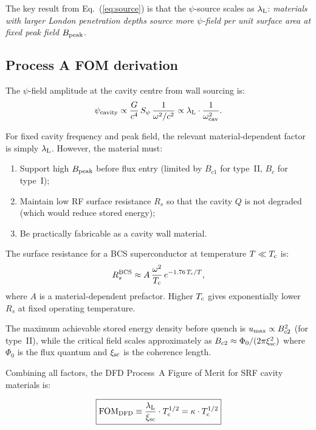 \documentclass[11pt]{article}
\newcommand{\lambdaL}{\lambda_{\rm L}}
\newcommand{\xsc}{\xi_{\rm sc}}
\newcommand{\Tc}{T_{\rm c}}
\newcommand{\FOM}{\mathrm{FOM}}
\begin{document}
The key result from Eq.~(\ref{eq:source}) is that the $\psi$-source scales
as $\lambdaL$: \emph{materials with larger London penetration depths source
more $\psi$-field per unit surface area at fixed peak field $B_{\rm peak}$.}

\subsection{Process A FOM derivation}

The $\psi$-field amplitude at the cavity centre from wall sourcing is:
\begin{equation}
\psi_{\rm cavity} \propto \frac{G}{c^4}\,S_\psi\,\frac{1}{\omega^2 / c^2}
\propto \lambdaL \cdot \frac{1}{\omega_{\rm cav}^2}.
\end{equation}

For fixed cavity frequency and peak field, the relevant material-dependent
factor is simply $\lambdaL$. However, the material must:
\begin{enumerate}
\item Support high $B_{\rm peak}$ before flux entry (limited by $B_{c1}$ for
  type~II, $B_c$ for type~I);
\item Maintain low RF surface resistance $R_s$ so that the cavity $Q$ is not
  degraded (which would reduce stored energy);
\item Be practically fabricable as a cavity wall material.
\end{enumerate}

The surface resistance for a BCS superconductor at temperature $T \ll \Tc$ is:
\begin{equation}
R_s^{\rm BCS} \approx A\,\frac{\omega^2}{\Tc}\,e^{-1.76\,\Tc/T},
\label{eq:Rs}
\end{equation}
where $A$ is a material-dependent prefactor. Higher $\Tc$ gives exponentially
lower $R_s$ at fixed operating temperature.

The maximum achievable stored energy density before quench is
$u_{\rm max} \propto B_{c2}^2$ (for type~II), while the critical field
scales approximately as $B_{c2} \approx \Phi_0 / (2\pi \xsc^2)$ where
$\Phi_0$ is the flux quantum and $\xsc$ is the coherence length.

Combining all factors, the DFD Process~A Figure of Merit for SRF cavity
materials is:

\begin{equation}
\boxed{
\FOM_{\rm DFD} \equiv \frac{\lambdaL}{\xsc} \cdot \Tc^{1/2}
= \kappa \cdot \Tc^{1/2}
}
\label{eq:fom-dfd}
\end{equation}
\end{document}
